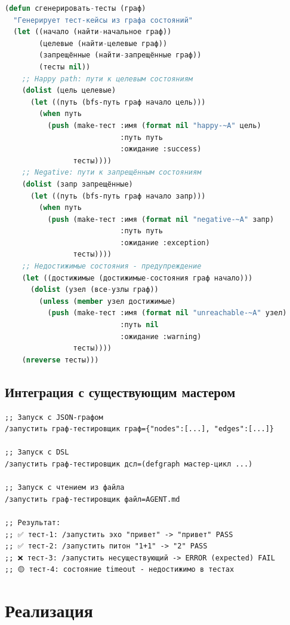 \documentclass[12pt, a4paper, twoside]{article}
\begin{document}
\begin{lstlisting}[language=CommonLisp,caption={Алгоритм генерации тестов}]
(defun сгенерировать-тесты (граф)
  "Генерирует тест-кейсы из графа состояний"
  (let ((начало (найти-начальное граф))
        (целевые (найти-целевые граф))
        (запрещённые (найти-запрещённые граф))
        (тесты nil))
    ;; Happy path: пути к целевым состояниям
    (dolist (цель целевые)
      (let ((путь (bfs-путь граф начало цель)))
        (when путь
          (push (make-тест :имя (format nil "happy-~A" цель)
                           :путь путь
                           :ожидание :success)
                тесты))))
    ;; Negative: пути к запрещённым состояниям
    (dolist (запр запрещённые)
      (let ((путь (bfs-путь граф начало запр)))
        (when путь
          (push (make-тест :имя (format nil "negative-~A" запр)
                           :путь путь
                           :ожидание :exception)
                тесты))))
    ;; Недостижимые состояния - предупреждение
    (let ((достижимые (достижимые-состояния граф начало)))
      (dolist (узел (все-узлы граф))
        (unless (member узел достижимые)
          (push (make-тест :имя (format nil "unreachable-~A" узел)
                           :путь nil
                           :ожидание :warning)
                тесты))))
    (nreverse тесты)))
\end{lstlisting}

\subsection{Интеграция с существующим мастером}

\begin{lstlisting}[language={},numbers=none,caption={Пример команд}]
;; Запуск с JSON-графом
/запустить граф-тестировщик граф={"nodes":[...], "edges":[...]}

;; Запуск с DSL
/запустить граф-тестировщик дсл=(defgraph мастер-цикл ...)

;; Запуск с чтением из файла
/запустить граф-тестировщик файл=AGENT.md

;; Результат:
;; ✅ тест-1: /запустить эхо "привет" -> "привет" PASS
;; ✅ тест-2: /запустить питон "1+1" -> "2" PASS
;; ❌ тест-3: /запустить несуществующий -> ERROR (expected) FAIL
;; 🟡 тест-4: состояние timeout - недостижимо в тестах
\end{lstlisting}

\section{Реализация}
\end{document}
